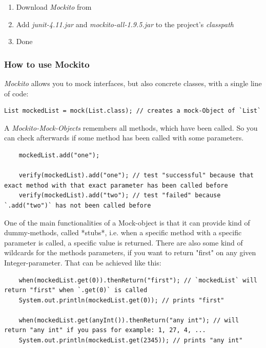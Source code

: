 \documentclass[11pt, a4paper]{article}
\begin{document}
\begin{enumerate}
	\item Download \textit{Mockito} from \cite{MockitoDownload}
	\item Add \textit{junit-4.11.jar} and \textit{mockito-all-1.9.5.jar} to the project's \textit{classpath}
	\item Done
\end{enumerate}

\subsubsection{How to use Mockito}

\textit{Mockito} allows you to mock interfaces, but also concrete classes, with a single line of code:
	
\begin{lstlisting} 
List mockedList = mock(List.class); // creates a mock-Object of `List` 
\end{lstlisting}
	
A \textit{Mockito-Mock-Objects} remembers all methods, which have been called. So you can check afterwards if some method has been called with some parameters.
	
\begin{lstlisting}
	mockedList.add("one");
	    
	verify(mockedList).add("one"); // test "successful" because that exact method with that exact parameter has been called before
	verify(mockedList).add("two"); // test "failed" because `.add("two")` has not been called before
\end{lstlisting}

One of the main functionalities of a Mock-object is that it can provide kind of dummy-methods, called *stubs*, i.e. when a specific method with a specific parameter is called, a specific
value is returned. There are also some kind of wildcards for the methods parameters, if you want to return "first" on any given Integer-parameter. That can be achieved like this:

\begin{lstlisting}
    when(mockedList.get(0)).thenReturn("first"); // `mockedList` will return "first" when `.get(0)` is called
    System.out.println(mockedList.get(0)); // prints "first"
    
    when(mockedList.get(anyInt()).thenReturn("any int"); // will return "any int" if you pass for example: 1, 27, 4, ...
    System.out.println(mockedList.get(2345)); // prints "any int"
\end{lstlisting}
\end{document}
